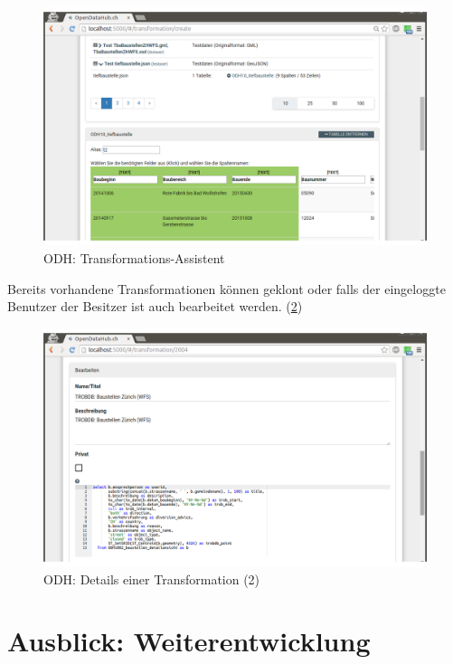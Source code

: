 \begin{figure}[H]
    \centering
    \includegraphics[width=2\linewidth/3]{fig/odh-transformation-assistant}
    \caption{ODH: Transformations-Assistent}
    \label{fig:tb:odh-transformation-assistant}
\end{figure}

Bereits vorhandene Transformationen können geklont oder falls der eingeloggte Benutzer der Besitzer ist auch bearbeitet werden. (\cref{fig:tb:odh-transformation-edit})

\begin{figure}[H]
    \centering
    \includegraphics[width=2\linewidth/3]{fig/odh-edit-transformation}
    \caption{ODH: Details einer Transformation (2)}
    \label{fig:tb:odh-transformation-edit}
\end{figure}

\section{Ausblick: Weiterentwicklung}

